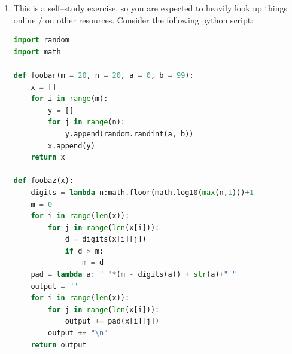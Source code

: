 \documentclass[a4paper, 11pt]{article}
\theoremstyle{definition}
\begin{document}
\begin{enumerate}[label = E\arabic*.]
\begin{enumerate}
			\item Write a function named \texttt{max\_triplet\_sum} which accepts a list of positive integers as an argument and returns the positions of the \textbf{three consecutive numbers} in the list with the \textbf{largest product}. For instance, for input \texttt{a = [4, 5, 8, 1, 9, 0, 3, 2]}, the desired output should be: \texttt{0, 1, 2}, since this corresponds to $4\times 5\times 8=160$, which is the largest product of three consecutive integers in this list.
			\item Modify the above functions to work for $n$--tuples instead of triplets ($n$ should be provided as an argument). As always, take care to raise exceptions in faulty cases (e.g., when the list does not have an appropriate size). Name your functions \texttt{max\_ntuple}, \texttt{max\_ntuple\_sum}, and \texttt{max\_ntuple\_prod}, respectively.
			\item Use \texttt{foo} from E1 to help you test your functions.
		\end{enumerate}
		\item This is a self--study exercise, so you are expected to heavily look up things online / on other resources. Consider the following python script:
		\begin{lstlisting}[language=Python]
import random
import math

def foobar(m = 20, n = 20, a = 0, b = 99):
	x = []
	for i in range(m):
		y = []
		for j in range(n):
			y.append(random.randint(a, b))
		x.append(y)
	return x

def foobaz(x):
	digits = lambda n:math.floor(math.log10(max(n,1)))+1
	m = 0
	for i in range(len(x)):
		for j in range(len(x[i])):
			d = digits(x[i][j])
			if d > m:
				m = d
	pad = lambda a: " "*(m - digits(a)) + str(a)+" "
	output = ""
	for i in range(len(x)):
		for j in range(len(x[i])):
			output += pad(x[i][j])
		output += "\n"
	return output


\end{lstlisting}
\end{enumerate}
\end{document}
